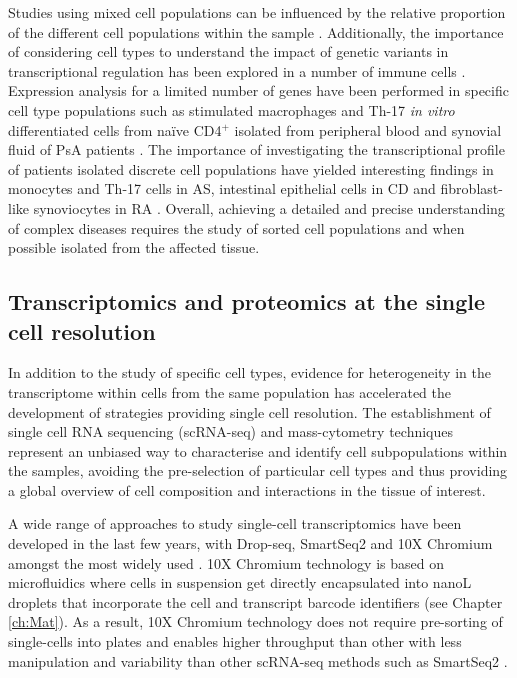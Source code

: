 Studies using mixed cell populations can be influenced by the relative proportion of the different cell populations within the sample \parencite{Whitney2003}. Additionally, the importance of considering cell types to understand the impact of genetic variants in transcriptional regulation has been explored in a number of immune cells \parencite{Fairfax2012, Fairfax2014, Raj2014, Peters2016, Kasela2017}. %
Expression analysis for a limited number of genes have been performed in specific cell type populations such as stimulated macrophages and Th-17 \textit{in vitro} differentiated cells from na\"{i}ve CD4$^+$ isolated from peripheral blood and synovial fluid of PsA patients \parencite{Antoniv2006, Leipe2010}. The importance of investigating the transcriptional profile of patients isolated discrete cell populations have yielded interesting findings in monocytes and Th-17 cells in AS, intestinal epithelial cells in CD and fibroblast-like synoviocytes in RA \parencite{Al-Mossawi2017,Smith2008, Howell2018, Ai2016}. Overall, achieving a detailed and precise understanding of complex diseases requires the study of sorted cell populations and when possible isolated from the affected tissue.  


\subsection{Transcriptomics and proteomics at the single cell resolution}

In addition to the study of specific cell types, evidence for heterogeneity in the transcriptome within cells from the same population has accelerated the development of strategies providing single cell resolution. The establishment of single cell RNA sequencing (scRNA-seq) and mass-cytometry techniques represent an unbiased way to characterise and identify cell subpopulations within the samples, avoiding the pre-selection of particular cell types and thus providing a global overview of cell composition and interactions in the tissue of interest. 

A wide range of approaches to study single-cell transcriptomics have been developed in the last few years, with Drop-seq, SmartSeq2 and 10X Chromium amongst the most widely used \parencite{Picelli2014,Ziegenhain2017}. 10X Chromium technology is based on microfluidics where cells in suspension get directly encapsulated into nanoL droplets that incorporate the cell and transcript barcode identifiers (see Chapter \ref{ch:Mat}). As a result, 10X Chromium technology does not require pre-sorting of single-cells into plates and enables higher throughput than other with less manipulation and variability than other scRNA-seq methods such as SmartSeq2 \parencite{Baran-Gale2017}.
 
